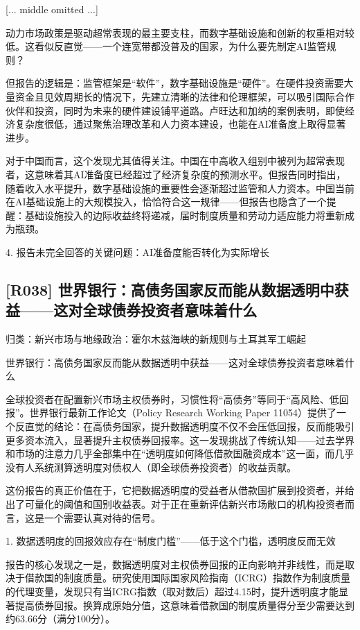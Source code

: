 \documentclass[11pt]{ctexart}
\begin{document}
[... middle omitted ...]

动力市场政策是驱动超常表现的最主要支柱，而数字基础设施和创新的权重相对较低。这看似反直觉——一个连宽带都没普及的国家，为什么要先制定AI监管规则？

但报告的逻辑是：监管框架是“软件”，数字基础设施是“硬件”。在硬件投资需要大量资金且见效周期长的情况下，先建立清晰的法律和伦理框架，可以吸引国际合作伙伴和投资，同时为未来的硬件建设铺平道路。卢旺达和加纳的案例表明，即使经济复杂度很低，通过聚焦治理改革和人力资本建设，也能在AI准备度上取得显著进步。

对于中国而言，这个发现尤其值得关注。中国在中高收入组别中被列为超常表现者，这意味着其AI准备度已经超过了经济复杂度的预测水平。但报告同时指出，随着收入水平提升，数字基础设施的重要性会逐渐超过监管和人力资本。中国当前在AI基础设施上的大规模投入，恰恰符合这一规律——但报告也隐含了一个提醒：基础设施投入的边际收益终将递减，届时制度质量和劳动力适应能力将重新成为瓶颈。

4. 报告未完全回答的关键问题：AI准备度能否转化为实际增长

\subsection{[R038] 世界银行：高债务国家反而能从数据透明中获益——这对全球债券投资者意味着什么}
{\small\color{refgray}归类：新兴市场与地缘政治：霍尔木兹海峡的新规则与土耳其军工崛起}

世界银行：高债务国家反而能从数据透明中获益——这对全球债券投资者意味着什么

全球投资者在配置新兴市场主权债券时，习惯性将“高债务”等同于“高风险、低回报”。世界银行最新工作论文（Policy Research Working Paper 11054）提供了一个反直觉的结论：在高债务国家，提升数据透明度不仅不会压低回报，反而能吸引更多资本流入，显著提升主权债券回报率。这一发现挑战了传统认知——过去学界和市场的注意力几乎全部集中在“透明度如何降低借款国融资成本”这一面，而几乎没有人系统测算透明度对债权人（即全球债券投资者）的收益贡献。

这份报告的真正价值在于，它把数据透明度的受益者从借款国扩展到投资者，并给出了可量化的阈值和国别收益表。对于正在重新评估新兴市场敞口的机构投资者而言，这是一个需要认真对待的信号。

1. 数据透明度的回报效应存在“制度门槛”——低于这个门槛，透明度反而无效

报告的核心发现之一是，数据透明度对主权债券回报的正向影响并非线性，而是取决于借款国的制度质量。研究使用国际国家风险指南（ICRG）指数作为制度质量的代理变量，发现只有当ICRG指数（取对数后）超过4.15时，提升透明度才能显著提高债券回报。换算成原始分值，这意味着借款国的制度质量得分至少需要达到约63.66分（满分100分）。
\end{document}
